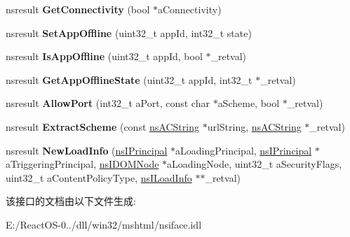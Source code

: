 \begin{DoxyCompactItemize}
nsresult {\bfseries Get\+Connectivity} (bool $\ast$a\+Connectivity)
\item 
\mbox{\label{interfacens_i_i_o_service_adfb15788d23948325a32a923e06eb083}} 
nsresult {\bfseries Set\+App\+Offline} (uint32\+\_\+t app\+Id, int32\+\_\+t state)
\item 
\mbox{\label{interfacens_i_i_o_service_aa87d4aacf8c9934f73a1d6303c89998f}} 
nsresult {\bfseries Is\+App\+Offline} (uint32\+\_\+t app\+Id, bool $\ast$\+\_\+retval)
\item 
\mbox{\label{interfacens_i_i_o_service_a6c55cb3e4d69283ae305ae4098699522}} 
nsresult {\bfseries Get\+App\+Offline\+State} (uint32\+\_\+t app\+Id, int32\+\_\+t $\ast$\+\_\+retval)
\item 
\mbox{\label{interfacens_i_i_o_service_adf6894a70ad5f67abba3b58692848f8d}} 
nsresult {\bfseries Allow\+Port} (int32\+\_\+t a\+Port, const char $\ast$a\+Scheme, bool $\ast$\+\_\+retval)
\item 
\mbox{\label{interfacens_i_i_o_service_a5a4fc6fc343c89448ad10b2f8a788e27}} 
nsresult {\bfseries Extract\+Scheme} (const \hyperlink{structns_c_string_container}{ns\+A\+C\+String} $\ast$url\+String, \hyperlink{structns_c_string_container}{ns\+A\+C\+String} $\ast$\+\_\+retval)
\item 
\mbox{\label{interfacens_i_i_o_service_a90df21973b22f8a12e4855bb74108811}} 
nsresult {\bfseries New\+Load\+Info} (\hyperlink{interfacens_i_supports}{ns\+I\+Principal} $\ast$a\+Loading\+Principal, \hyperlink{interfacens_i_supports}{ns\+I\+Principal} $\ast$a\+Triggering\+Principal, \hyperlink{interfacens_i_d_o_m_node}{ns\+I\+D\+O\+M\+Node} $\ast$a\+Loading\+Node, uint32\+\_\+t a\+Security\+Flags, uint32\+\_\+t a\+Content\+Policy\+Type, \hyperlink{interfacens_i_supports}{ns\+I\+Load\+Info} $\ast$$\ast$\+\_\+retval)
\end{DoxyCompactItemize}


该接口的文档由以下文件生成\+:\begin{DoxyCompactItemize}
\item 
E\+:/\+React\+O\+S-\/0../dll/win32/mshtml/nsiface.\+idl\end{DoxyCompactItemize}
